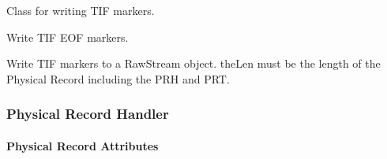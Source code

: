 \documentclass[letterpaper,10pt,english]{sphinxmanual}
\begin{document}

\begin{fulllineitems}
\label{\detokenize{ref/LIS/core/TifMarker:TotalDepth.LIS.core.TifMarker.TifMarkerWrite}}
Class for writing TIF markers.

\begin{fulllineitems}
\label{\detokenize{ref/LIS/core/TifMarker:TotalDepth.LIS.core.TifMarker.TifMarkerWrite.close}}
Write TIF EOF markers.

\end{fulllineitems}


\begin{fulllineitems}
\label{\detokenize{ref/LIS/core/TifMarker:TotalDepth.LIS.core.TifMarker.TifMarkerWrite.write}}
Write TIF markers to a RawStream object. theLen must be the length
of the Physical Record including the PRH and PRT.

\end{fulllineitems}


\end{fulllineitems}



\subsubsection{Physical Record Handler}
\label{\detokenize{ref/LIS/core/PhysRec::doc}}\label{\detokenize{ref/LIS/core/PhysRec:physical-record-handler}}\label{\detokenize{ref/LIS/core/PhysRec:module-TotalDepth.LIS.core.PhysRec}}

\paragraph{Physical Record Attributes}
\label{\detokenize{ref/LIS/core/PhysRec:physical-record-attributes}}
\end{document}
